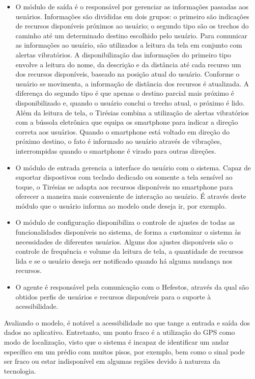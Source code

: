 \documentclass[english,brazilian]{UNISINOSmonografia}
\begin{document}
\begin{itemize}
	\item O módulo de saída é o responsável por gerenciar as informações passadas aos usuários. Informações são divididas em dois grupos: o primeiro são indicações de recursos disponíveis próximos ao usuário; o segundo tipo são os trechos do caminho até um determinado destino escolhido pelo usuário. Para comunicar as informações ao usuário, são utilizados a leitura da tela em conjunto com alertas vibratórios. A disponibilização das informações do primeiro tipo envolve a leitura do nome, da descrição e da distância até cada recurso um dos recursos disponíveis, baseado na posição atual do usuário. Conforme o usuário se movimenta, a informação de distância dos recursos é atualizada. A diferença do segundo tipo é que apenas o destino parcial mais próximo é disponibilizado e, quando o usuário conclui o trecho atual, o próximo é lido. Além da leitura de tela, o Tirésias combina a utilização de alertas vibratórios com a bússola eletrônica que equipa os smartphone para indicar a direção correta aos usuários. Quando o smartphone está voltado em direção do próximo destino, o fato é informado ao usuário através de vibrações, interrompidas quando o smartphone é virado para outras direções.

	\item O módulo de entrada gerencia a interface do usuário com o sistema. Capaz de suportar dispostivos com teclado dedicado ou somente a tela sensível ao toque, o Tirésias se adapta aos recursos disponíveis no smartphone para oferecer a maneira mais conveniente de interação ao usuário. É através deste módulo que o usuário informa ao modelo onde deseja ir, por exemplo.

	\item O módulo de configuração disponibiliza o controle de ajustes de todas as funcionalidades disponíveis no sistema, de forma a customizar o sistema às necessidades de diferentes usuários. Alguns dos ajustes disponíveis são o controle de frequência e volume da leitura de tela, a quantidade de recursos lida e se o usuário deseja ser notificado quando há alguma mudança nos recursos.

	\item O agente é responsável pela comunicação com o Hefestos, através da qual são obtidos perfis de usuários e recursos disponíveis para o suporte à acessibilidade.
\end{itemize} 

Avaliando o modelo, é notável a acessibilidade no que tange a entrada e saída dos dados no aplicativo. Entretanto, um ponto fraco é a utilização do GPS como modo de localização, visto que o sistema é incapaz de identificar um andar específico em um prédio com muitos pisos, por exemplo, bem como o sinal pode ser fraco ou estar indisponível em algumas regiões devido à natureza da tecnologia. 
\end{document}
